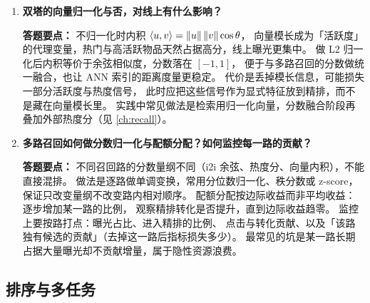 \begin{interview}[题库与答题要点]
\begin{enumerate}[label=]
  \item[\textcolor{VioletDeep}{\textbf{Q12.}}] \textbf{双塔的向量归一化与否，对线上有什么影响？}
\par\smallskip\noindent\textcolor{VioletDeep}{\textbf{答题要点：}}
不归一化时内积 $\left\langle u, v \right\rangle = \left\lVert u \right\rVert\left\lVert v \right\rVert\cos\theta$，
向量模长成为「活跃度」的代理变量，热门与高活跃物品天然占据高分，线上曝光更集中。
做 L2 归一化后内积等价于余弦相似度，分数落在 $[-1,1]$，
便于与多路召回的分数做统一融合，也让 ANN 索引的距离度量更稳定。
代价是丢掉模长信息，可能损失一部分活跃度与热度信号，
此时应把这些信号作为显式特征放到精排，而不是藏在向量模长里。
实践中常见做法是检索用归一化向量，分数融合阶段再叠加外部热度分（见 \cref{ch:recall}）。

  \item[\textcolor{VioletDeep}{\textbf{Q13.}}] \textbf{多路召回如何做分数归一化与配额分配？如何监控每一路的贡献？}
\par\smallskip\noindent\textcolor{VioletDeep}{\textbf{答题要点：}}
不同召回路的分数量纲不同（i2i 余弦、热度分、向量内积），不能直接混排。
做法是逐路做单调变换，常用分位数归一化、秩分数或 z-score，保证只改变量纲不改变路内相对顺序。
配额分配按边际收益而非平均收益：逐步增加某一路的比例，
观察精排转化是否提升，直到边际收益趋零。
监控上要按路打点：曝光占比、进入精排的比例、
点击与转化贡献、以及「该路独有候选的贡献」（去掉这一路后指标损失多少）。
最常见的坑是某一路长期占据大量曝光却不贡献增量，属于隐性资源浪费。

\end{enumerate}

\end{interview}

\subsection{排序与多任务}

